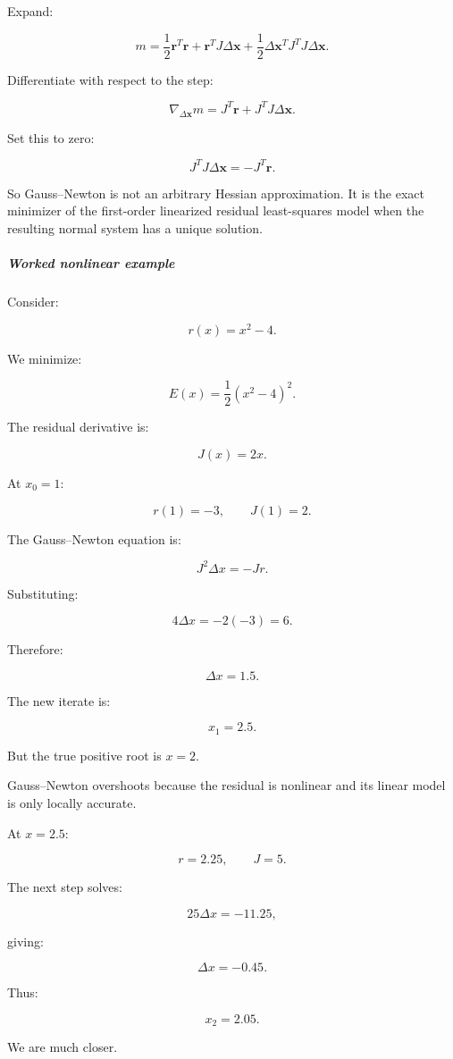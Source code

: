 Expand:

\[
m= \frac12\mathbf r^T\mathbf r +\mathbf r^TJ\Delta\mathbf x +\frac12\Delta\mathbf x^TJ^TJ\Delta\mathbf x.
\]

Differentiate with respect to the step:

\[
\nabla_{\Delta\mathbf x}m = J^T\mathbf r+J^TJ\Delta\mathbf x.
\]

Set this to zero:

\[
\boxed{ J^TJ\Delta\mathbf x=-J^T\mathbf r }.
\]

So Gauss--Newton is not an arbitrary Hessian approximation. It is the exact minimizer of the first-order linearized residual least-squares model when the resulting normal system has a unique solution.

\subparagraph{Worked nonlinear example}\label{worked-nonlinear-example}

Consider:

\[
r(x)=x^2-4.
\]

We minimize:

\[
E(x)=\frac12(x^2-4)^2.
\]

The residual derivative is:

\[
J(x)=2x.
\]

At \(x_0=1\):

\[
r(1)=-3,\qquad J(1)=2.
\]

The Gauss--Newton equation is:

\[
J^2\Delta x=-Jr.
\]

Substituting:

\[
4\Delta x=-2(-3)=6.
\]

Therefore:

\[
\boxed{\Delta x=1.5}.
\]

The new iterate is:

\[
x_1=2.5.
\]

But the true positive root is \(x=2\).

Gauss--Newton overshoots because the residual is nonlinear and its linear model is only locally accurate.

At \(x=2.5\):

\[
r=2.25,\qquad J=5.
\]

The next step solves:

\[
25\Delta x=-11.25,
\]

giving:

\[
\Delta x=-0.45.
\]

Thus:

\[
x_2=2.05.
\]

We are much closer.

